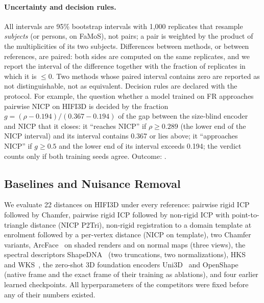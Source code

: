 \paragraph{Uncertainty and decision rules.}
All intervals are 95\% bootstrap intervals with 1{,}000 replicates that
resample \emph{subjects} (or persons, on FaMoS), not pairs; a pair is weighted
by the product of the multiplicities of its two subjects. Differences between
methods, or between references, are paired: both sides are computed on the
same replicates, and we report the interval of the difference together with
the fraction of replicates in which it is $\le 0$. Two methods whose paired
interval contains zero are reported as not distinguishable, not as
equivalent.
Decision rules are declared with the protocol. For example, the question
whether a model trained on FR approaches pairwise NICP on HIFI3D is decided
by the fraction $g=(\rho-0.194)/(0.367-0.194)$ of the gap between the
size-blind encoder and NICP that it closes: it ``reaches NICP'' if
$\rho\ge0.289$ (the lower end of the NICP interval) and its interval contains
0.367 or lies above; it ``approaches NICP'' if $g\ge0.5$ and the lower end of
its interval exceeds 0.194; the verdict counts only if both training seeds
agree.
Outcome: .

\subsection{Baselines and Nuisance Removal}
\label{sec:protocol_baselines}

We evaluate 22 distances on HIFI3D under every reference: pairwise rigid ICP
followed by Chamfer, pairwise rigid ICP followed by non-rigid ICP with
point-to-triangle distance (NICP P2Tri), non-rigid registration to a domain
template at enrolment followed by a per-vertex distance (NICP on template),
two Chamfer variants, ArcFace~\cite{deng2019arcface} on shaded renders and on
normal maps (three views), the spectral descriptors
ShapeDNA~\cite{reuter2006shapedna} (two truncations, two normalizations),
HKS~\cite{sun2009hks} and WKS~\cite{aubry2011wks}, the zero-shot 3D foundation
encoders Uni3D~\cite{uni3d} and OpenShape~\cite{openshape} (native frame and
the exact frame of their training as ablations), and four earlier learned
checkpoints.
All hyperparameters of the competitors were fixed before any of their numbers
existed.


